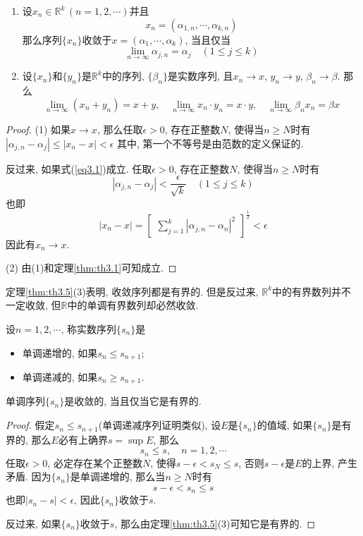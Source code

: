 \documentclass[cn,12pt,math=mtpro2,citestyle=gb7714-2015,bibstyle=gb7714-2015,twocol]{elegantbook}
\newcommand{\R}{\mathbb{R}}
\newcommand{\bx}{x}
\newcommand{\limn }{\lim_{n\to\infty}}
\newcommand{\y}{y}
\begin{document}
\begin{theorem}
  \begin{enumerate}[label=(\arabic*)]
  \item 设$\bx_n\in\R^k\,(n=1,2,\cdots)$并且
  $$\bx_n=(\alpha_{1,n},\cdots,\alpha_{k,n})$$
  那么序列$\{x_n\}$收敛于$\bx=(\alpha_1,\cdots,\alpha_k)$, 当且仅当
  \begin{equation}\label{eq3.1}
  \limn \alpha_{j,n}=\alpha_j\quad(1\leq j\leq k)
  \end{equation}

  \item 设$\{\bx_n\}$和$\{\y _n\}$是$\R^k$中的序列, $\{\beta_n\}$是实数序列, 且$\bx_n\rightarrow \bx$, $\y _n\rightarrow\y $, $\beta_n\rightarrow\beta$. 那么
  $$\limn (\bx_n+\y _n)=\bx+\y ,\quad \limn \bx_n\cdot\y _n=\bx\cdot\y ,\quad\limn \beta_n\bx_n=\beta\bx$$
  \end{enumerate}
\end{theorem}
\begin{proof}
   (1) 如果$\bx\rightarrow\bx$, 那么任取$\epsilon>0$, 存在正整数$N$, 使得当$n\geq N$时有
  $|\alpha_{j,n}-\alpha_j|\leq|\bx_n-\bx|<\epsilon$
  其中, 第一个不等号是由范数的定义保证的.

  反过来, 如果式(\ref{eq3.1})成立. 任取$\epsilon>0$, 存在正整数$N$, 使得当$n\geq N$时有
  $$|\alpha_{j,n}-\alpha_j|<\frac{\epsilon}{\sqrt{k}}\quad (1\leq j\leq k)$$
  也即
  $$|\bx_n-\bx|=\begin{bmatrix}
                      \displaystyle\sum_{j=1}^{k}|\alpha_{j,n}-\alpha_n|^2
                    \end{bmatrix}^{\frac{1}{2}}<\epsilon
  $$
  因此有$\bx_n\rightarrow\bx$.

  (2) 由(1)和定理\ref{thm:th3.1}可知成立.
\end{proof}
定理\ref{thm:th3.5}(3)表明, 收敛序列都是有界的. 但是反过来, $\R^k$中的有界数列并不一定收敛, 但$\R$中的单调有界数列却必然收敛.
\begin{definition}
设$n=1,2,\cdots$, 称实数序列$\{s_n\}$是
\begin{itemize}
\item 单调递增的, 如果$s_n\leq s_{n+1}$;

\item 单调递减的, 如果$s_n\geq s_{n+1}$.
\end{itemize}
\end{definition}
\begin{theorem}[单调有界收敛定理]\label{thm:th3.6}
  单调序列$\{s_n\}$是收敛的, 当且仅当它是有界的.
\end{theorem}
\begin{proof}
  假定$s_n\leq s_{n+1}$(单调递减序列证明类似), 设$E$是$\{s_n\}$的值域, 如果$\{s_n\}$是有界的, 那么$E$必有上确界$s=\sup E$, 那么
  $$s_n\leq s,\quad n=1,2,\cdots$$
  任取$\epsilon>0$, 必定存在某个正整数$N$, 使得$s-\epsilon<s_N\leq s$, 否则$s-\epsilon$是$E$的上界, 产生矛盾. 因为$\{s_n\}$是单调递增的, 那么当$n\geq N$时有
  $$s-\epsilon<s_n\leq s$$
  也即$|s_n-s|<\epsilon$, 因此$\{s_n\}$收敛于$s$.

  反过来, 如果$\{s_n\}$收敛于$s$, 那么由定理\ref{thm:th3.5}(3)可知它是有界的.

\end{proof}
\end{document}
